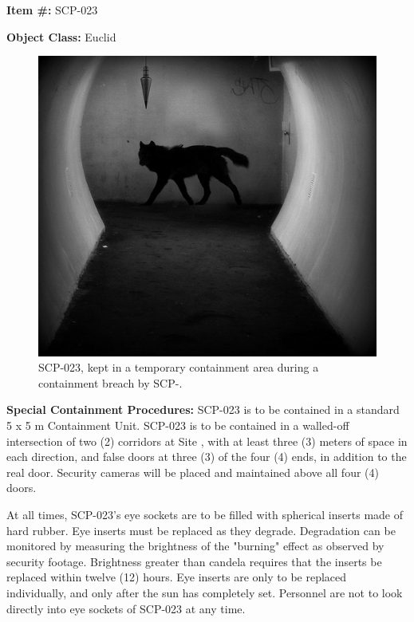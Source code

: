 
\textbf{Item \#:} SCP-023

\textbf{Object Class:} Euclid

\begin{figure}[h]
\begin{center}
\includegraphics[scale=0.5]{scp/023.jpg}
\linebreak SCP-023, kept in a temporary containment area during a containment breach by SCP-.
\end{center}
\end{figure}

\textbf{Special Containment Procedures:} SCP-023 is to be contained in a standard 5 x 5 m Containment Unit. SCP-023 is to be contained in a walled-off intersection of two (2) corridors at Site , with at least three (3) meters of space in each direction, and false doors at three (3) of the four (4) ends, in addition to the real door. Security cameras will be placed and maintained above all four (4) doors.

At all times, SCP-023's eye sockets are to be filled with spherical inserts made of hard rubber. Eye inserts must be replaced as they degrade. Degradation can be monitored by measuring the brightness of the "burning" effect as observed by security footage. Brightness greater than  candela requires that the inserts be replaced within twelve (12) hours. Eye inserts are only to be replaced individually, and only after the sun has completely set. Personnel are not to look directly into eye sockets of SCP-023 at any time.

